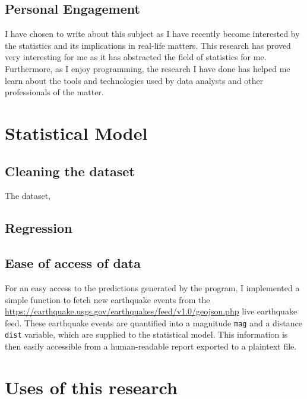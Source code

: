 \documentclass[11pt,letterpaper]{article}
\begin{document}
\subsection{Personal Engagement}

I have chosen to write about this subject as I have recently become interested by the 
statistics and its implications in real-life matters. This research has proved very 
interesting for me as it has abstracted the field of statistics for me. Furthermore, 
as I enjoy programming, the research I have done has helped me learn about the tools 
and technologies used by data analysts and other professionals of the matter. 


\section{}


\section{Statistical Model}

\subsection{Cleaning the dataset}

The dataset, \cite{noaa}

\subsection{Regression}


\subsection{Ease of access of data}
For an easy access to the predictions generated by the program, I implemented 
a simple function to fetch new earthquake events from the \url{https://earthquake.usgs.gov/earthquakes/feed/v1.0/geojson.php} 
live earthquake feed. These earthquake events are quantified into a magnitude \verb|mag| 
and a distance \verb|dist| variable, which are supplied to the statistical model. 
This information is then easily accessible from a human-readable report exported 
to a plaintext file. 

\section{Uses of this research}
\end{document}
